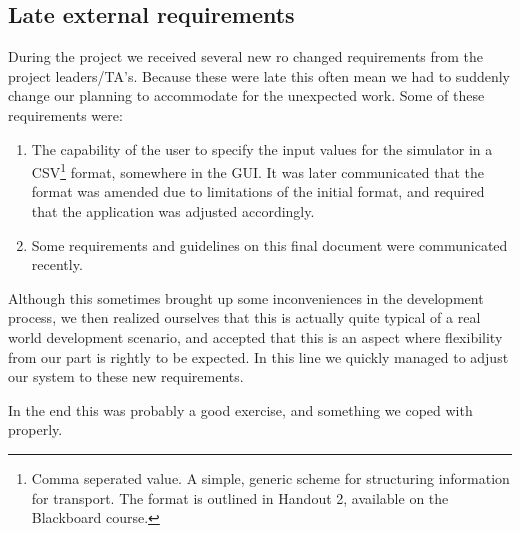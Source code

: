 \subsection{Late external requirements}
\label{late-requirements}
During the project we received several new ro changed requirements from the project leaders/TA's. Because these were late this often mean we had to suddenly change our planning to accommodate for the unexpected work. Some of these requirements were:
\begin{enumerate}
\item The capability of the user to specify the input values for the simulator in a CSV\footnote{Comma seperated value. A simple, generic scheme for structuring information for transport. The format is outlined in Handout 2, available on the Blackboard course.} format, somewhere in the GUI. It was later communicated that the format was amended due to limitations of the initial format, and required that the application was adjusted accordingly.
\item Some requirements and guidelines on this final document were communicated recently.
\end{enumerate}

Although this sometimes brought up some inconveniences in the development process, we then realized ourselves that this is actually quite typical of a real world development scenario, and accepted that this is an aspect where flexibility from our part is rightly  to be expected. In this line we quickly managed to adjust our system to these new requirements.

In the end this was probably a good exercise, and something we coped with properly.
